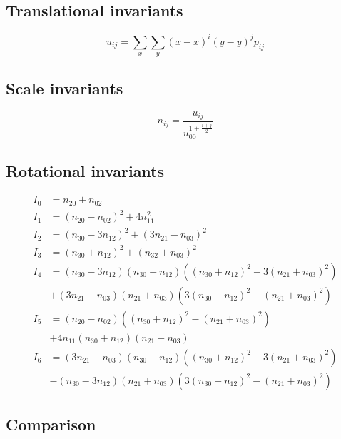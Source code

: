 \documentclass[]{article}
\begin{document}
\subsection{Translational invariants}\label{translational-invariants}

\[
u_{ij} = \sum_x \sum_y (x - \bar{x}) ^ i (y - \bar{y}) ^ j p_{ij}
\]

\subsection{Scale invariants}\label{scale-invariants}

\[
n_{ij} = \frac{u_{ij}}{u_{00} ^ {1 + \frac{i + j}{2}}}
\]

\subsection{Rotational invariants}\label{rotational-invariants}

\[
\begin{aligned}
I_0 &= n_{20} + n_{02} \\
I_1 &= (n_{20} - n_{02}) ^ 2 + 4 n_{11}^2 \\
I_2 &= (n_{30} - 3 n_{12}) ^ 2 + (3 n_{21} - n_{03}) ^ 2 \\
I_3 &= (n_{30} + n_{12}) ^ 2 + (n_{32} + n_{03}) ^ 2 \\
I_4 &= (n_{30} - 3 n_{12}) (n_{30} + n_{12})
        \left((n_{30} + n_{12}) ^ 2 - 3 (n_{21} + n_{03}) ^ 2\right) \\
        &+ (3 n_{21} - n_{03}) (n_{21} + n_{03})
        \left(3 (n_{30} + n_{12}) ^ 2 - (n_{21} + n_{03}) ^ 2\right) \\
I_5 &= (n_{20} - n_{02})
        \left((n_{30} + n_{12}) ^ 2 - (n_{21} + n_{03}) ^ 2\right) \\
        &+ 4 n_{11} (n_{30} + n_{12}) (n_{21} + n_{03}) \\
I_6 &= (3 n_{21} - n_{03}) (n_{30} + n_{12})
        \left((n_{30} + n_{12}) ^ 2 - 3 (n_{21} + n_{03}) ^ 2 \right) \\
        &- (n_{30} - 3 n_{12}) (n_{21} + n_{03})
        \left(3 (n_{30} + n_{12}) ^ 2 - (n_{21} + n_{03}) ^ 2 \right)
\end{aligned}
\]

\newpage

\subsection{Comparison}\label{comparison}
\end{document}
